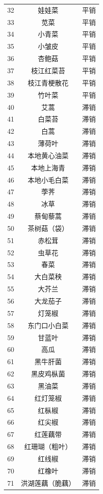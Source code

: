 \documentclass[a4paper,12pt]{article}
\begin{document}
\begin{longtable}{c|c|c}
		32 & 娃娃菜 & 平销 \\
		33 & 苋菜 & 平销 \\
		34 & 小青菜 & 平销 \\
		35 & 小皱皮 & 平销 \\
		36 & 杏鲍菇 & 平销 \\
		37 & 枝江红菜苔 & 平销 \\
		38 & 枝江青梗散花 & 平销 \\
		39 & 竹叶菜 & 平销 \\
		\hline
		40 & 艾蒿 & 滞销 \\
		41 & 白菜苔 & 滞销 \\
		42 & 白蒿 & 滞销 \\
		43 & 薄荷叶 & 滞销 \\
		44 & 本地黄心油菜 & 滞销 \\
		45 & 本地上海青 & 滞销 \\
		46 & 本地小毛白菜 & 滞销 \\
		47 & 荸荠 & 滞销 \\
		48 & 冰草 & 滞销 \\
		49 & 蔡甸藜蒿 & 滞销 \\
		50 & 茶树菇（袋） & 滞销 \\
		51 & 赤松茸 & 滞销 \\
		52 & 虫草花 & 滞销 \\
		53 & 春菜 & 滞销 \\
		54 & 大白菜秧 & 滞销 \\
		55 & 大芥兰 & 滞销 \\
		56 & 大龙茄子 & 滞销 \\
		57 & 灯笼椒 & 滞销 \\
		58 & 东门口小白菜 & 滞销 \\
		59 & 甘蓝叶 & 滞销 \\
		60 & 高瓜 & 滞销 \\
		61 & 黑牛肝菌 & 滞销 \\
		62 & 黑皮鸡枞菌 & 滞销 \\
		63 & 黑油菜 & 滞销 \\
		64 & 红灯笼椒 & 滞销 \\
		65 & 红枞椒 & 滞销 \\
		66 & 红尖椒 & 滞销 \\
		67 & 红莲藕带 & 滞销 \\
		68 & 红珊瑚（粗叶） & 滞销 \\
		69 & 红线椒 & 滞销 \\
		70 & 红橡叶 & 滞销 \\
		71 & 洪湖莲藕（脆藕） & 滞销 \\

\end{longtable}
\end{document}
